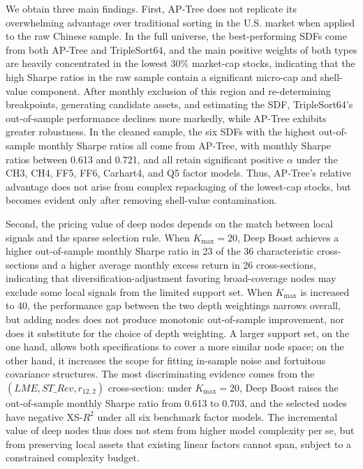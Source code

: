 \documentclass[12pt]{article}
\def\mathrm#1{#1}%
\begin{document}
We obtain three main findings. First, AP-Tree does not replicate its overwhelming advantage over traditional sorting in the U.S. market when applied to the raw Chinese sample. In the full universe, the best-performing SDFs come from both AP-Tree and TripleSort64, and the main positive weights of both types are heavily concentrated in the lowest \(30\%\) market-cap stocks, indicating that the high Sharpe ratios in the raw sample contain a significant micro-cap and shell-value component. After monthly exclusion of this region and re-determining breakpoints, generating candidate assets, and estimating the SDF, TripleSort64's out-of-sample performance declines more markedly, while AP-Tree exhibits greater robustness. In the cleaned sample, the six SDFs with the highest out-of-sample monthly Sharpe ratios all come from AP-Tree, with monthly Sharpe ratios between 0.613 and 0.721, and all retain significant positive \(\alpha\) under the CH3, CH4, FF5, FF6, Carhart4, and Q5 factor models. Thus, AP-Tree's relative advantage does not arise from complex repackaging of the lowest-cap stocks, but becomes evident only after removing shell-value contamination.

Second, the pricing value of deep nodes depends on the match between local signals and the sparse selection rule. When \(K_{\max}=20\), Deep Boost achieves a higher out-of-sample monthly Sharpe ratio in 23 of the 36 characteristic cross-sections and a higher average monthly excess return in 26 cross-sections, indicating that diversification-adjustment favoring broad-coverage nodes may exclude some local signals from the limited support set. When \(K_{\max}\) is increased to 40, the performance gap between the two depth weightings narrows overall, but adding nodes does not produce monotonic out-of-sample improvement, nor does it substitute for the choice of depth weighting. A larger support set, on the one hand, allows both specifications to cover a more similar node space; on the other hand, it increases the scope for fitting in-sample noise and fortuitous covariance structures. The most discriminating evidence comes from the \((\mathrm{LME},\mathrm{ST\_Rev},r_{12,2})\) cross-section: under \(K_{\max}=20\), Deep Boost raises the out-of-sample monthly Sharpe ratio from 0.613 to 0.703, and the selected nodes have negative XS-\(R^2\) under all six benchmark factor models. The incremental value of deep nodes thus does not stem from higher model complexity per se, but from preserving local assets that existing linear factors cannot span, subject to a constrained complexity budget.
\end{document}

